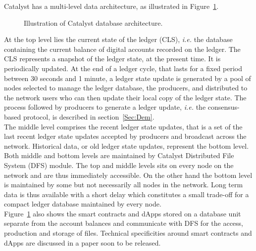  Catalyst has a multi-level data architecture, as illustrated in Figure~\ref{fig:db}. 

\begin{figure}[H]
\label{fig:db}
\caption{\label{fig:db} Illustration of Catalyst database architecture.}
\end{figure}

At the top level lies the current state of the ledger (CLS), \textit{i.e.} the database containing the current balance of digital accounts recorded on the ledger. The CLS represents a snapshot of the ledger state, at the present time. It is periodically updated. At the end of a ledger cycle, that lasts for a fixed period between 30 seconds and 1 minute, a ledger state update is generated by a pool of nodes selected to manage the ledger database, the producers, and distributed to the network users who can then update their local copy of the ledger state. The process followed by producers to generate a ledger update, \textit{i.e.} the consensus-based protocol, is described in section~\ref{Sec:Dem}.\\

The middle level comprises the recent ledger state updates, that is a set of the last recent ledger state updates accepted by producers and broadcast across the network. Historical data, or old ledger state updates, represent the bottom level. Both middle and bottom levels are maintained by Catalyst Distributed File System (DFS) module. The top and middle levels sits on every node on the network and are thus immediately accessible. On the other hand the bottom level is maintained by some but not necessarily all nodes in the network. Long term data is thus available with a short delay which constitutes a small trade-off for a compact ledger database maintained by every node.\\

Figure~\ref{fig:db} also shows the smart contracts and dApps stored on a database unit separate from the account balances and communicate with DFS for the access, production and storage of files. Technical specificities around smart contracts and dApps are discussed in a paper soon to be released.

